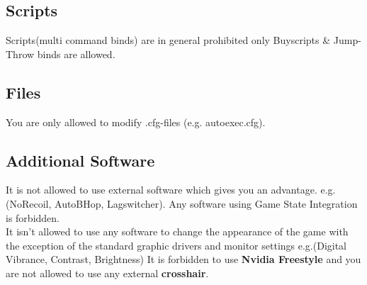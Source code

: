 \documentclass{article}
\begin{document}
\subsection{Scripts}
Scripts(multi command binds) are in general prohibited only Buyscripts \& Jump-Throw binds are allowed.

\subsection{Files}
You are only allowed to modify .cfg-files (e.g. autoexec.cfg).\\

\subsection{Additional Software}
It is not allowed to use external software which gives you an advantage. e.g.(NoRecoil, AutoBHop, Lagswitcher). Any software using Game State Integration is forbidden.\\
It isn't allowed to use any software to change the appearance of the game with the exception of the standard graphic drivers and monitor settings e.g.(Digital Vibrance, Contrast, Brightness)
It is forbidden to use \textbf{Nvidia Freestyle} and you are not allowed to use any external \textbf{crosshair}.




\pagebreak
\end{document}
